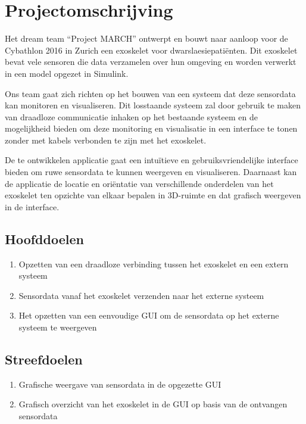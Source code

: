 \section{Projectomschrijving}
Het dream team ``Project MARCH'' ontwerpt en bouwt naar aanloop voor de Cybathlon 2016 in Zurich een exoskelet voor dwarslaesiepatiënten. Dit exoskelet bevat vele sensoren die data verzamelen over hun omgeving en worden verwerkt in een model opgezet in Simulink.

Ons team gaat zich richten op het bouwen van een systeem dat deze sensordata kan monitoren en visualiseren. Dit losstaande systeem zal door gebruik te maken van draadloze communicatie inhaken op het bestaande systeem en de mogelijkheid bieden om deze monitoring en visualisatie in een interface te tonen zonder met kabels verbonden te zijn met het exoskelet.

De te ontwikkelen applicatie gaat een intuïtieve en gebruiksvriendelijke interface bieden om ruwe sensordata te kunnen weergeven en visualiseren. Daarnaast kan de applicatie de locatie en oriëntatie van verschillende onderdelen van het exoskelet ten opzichte van elkaar bepalen in 3D-ruimte en dat grafisch weergeven in de interface.
\subsection{Hoofddoelen}
\begin{enumerate}
 \item Opzetten van een draadloze verbinding tussen het exoskelet en een extern systeem
 \item Sensordata vanaf het exoskelet verzenden naar het externe systeem
 \item Het opzetten van een eenvoudige GUI om de sensordata op het externe systeem te weergeven
\end{enumerate}
\subsection{Streefdoelen}
\begin{enumerate}
 \item Grafische weergave van sensordata in de opgezette GUI
 \item Grafisch overzicht van het exoskelet in de GUI op basis van de ontvangen sensordata
\end{enumerate}

